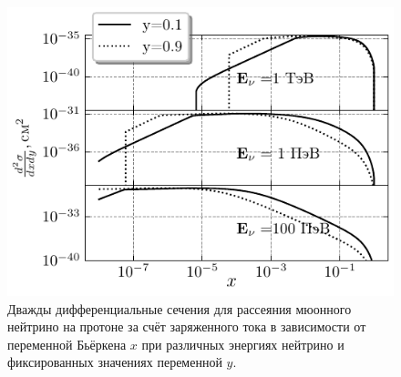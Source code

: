 \begin{figure}[!h]
\centering
\includegraphics[width=0.8\linewidth]{images/NuProp/xs_vs_xCT10nlo_cc_14_proton.pdf}
\caption{Дважды дифференциальные сечения для рассеяния мюонного нейтрино на протоне за счёт заряженного тока в зависимости от переменной Бьёркена $x$ при различных энергиях нейтрино и фиксированных значениях переменной $y$.}
\label{fig:xsec_2d}
\end{figure}

